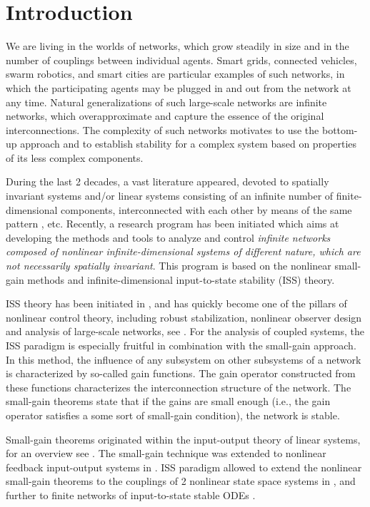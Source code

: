 \documentclass[twocolumn]{IEEEtran} %
\theoremstyle{definition}
\begin{document}
\section{Introduction}


We are living in the worlds of networks, which grow steadily in size and in the number of couplings between individual agents.
Smart grids, connected vehicles, swarm robotics, and smart cities are particular examples of such networks, in which the participating agents may be plugged in and out from the network at any time.
Natural generalizations of such large-scale networks are infinite networks, which overapproximate and capture the essence of the original interconnections.
The complexity of such networks motivates to use the bottom-up approach and to establish stability for a complex system based on properties of its less complex components.

During the last 2 decades, a vast literature appeared, devoted to spatially invariant systems and/or linear systems consisting of an infinite number of finite-dimensional components, interconnected with each other by means of the same pattern \cite{BPD02,BaV05,BeJ17,CIZ09,JoB05b}, etc.
Recently, a research program has been initiated which aims at developing the methods and tools to analyze and control 
\emph{infinite networks composed of nonlinear infinite-dimensional systems of different nature, which are not necessarily spatially invariant}.
This program is based on the nonlinear small-gain methods and infinite-dimensional input-to-state stability (ISS) theory.


ISS theory has been initiated in \cite{Son89}, and has quickly become one of the pillars of nonlinear control theory, including robust stabilization, nonlinear observer design and analysis of large-scale networks, see \cite{KKK95,ArK01,Son08}. For the analysis of coupled systems, the ISS paradigm is especially fruitful in combination with the small-gain approach. 
In this method, the influence of any subsystem on other subsystems of a network is characterized by so-called gain functions. The gain operator constructed from these functions characterizes the interconnection structure of the network. 
The small-gain theorems state that if the gains are small enough (i.e., the gain operator satisfies a some sort of small-gain condition), the network is stable.%

Small-gain theorems originated within the input-output theory of linear systems, for an overview see \cite{DeV09}.
The small-gain technique was extended to nonlinear feedback input-output systems in \cite{Hil91, MaH92}.
ISS paradigm allowed to extend the nonlinear small-gain theorems to the couplings of 2 nonlinear state space systems in \cite{JTP94, JMW96}, and further to finite networks of input-to-state stable ODEs \cite{DRW07,DRW10}.
\end{document}
